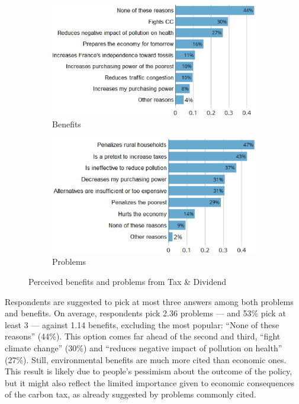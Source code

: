 \documentclass[english,5p,authoryear]{elsarticle}
\begin{document}
\begin{figure}[t]
\centering
\begin{subfigure}[b]{\columnwidth}
   \caption{Benefits}
   \includegraphics[width=\columnwidth]{Images_EPS/CC_benefits_synchro.eps}
\end{subfigure}

\begin{subfigure}[b]{\columnwidth}
\vspace{0.3cm}
   \caption{Problems}
   \includegraphics[width=\columnwidth]{Images_EPS/CC_problems_synchro.eps}
\end{subfigure}
\caption{Perceived benefits and problems from Tax \& Dividend}
   \label{fig:benefits_problems}
\end{figure}

Respondents are suggested to pick at most three answers among both problems and benefits. On average, respondents pick 2.36 problems --- and 53\% pick at least 3 --- against 1.14 benefits, excluding the most popular: ``None of these reasons'' (44\%). This option comes far ahead of the second and third, ``fight climate change'' (30\%) and ``reduces negative impact of pollution on health'' (27\%). Still, environmental benefits are much more cited than economic ones. This result is likely due to people's pessimism about the outcome of the policy, but it might also reflect the limited importance given to economic consequences of the carbon tax, as already suggested by problems commonly cited. %
%
\end{document}
